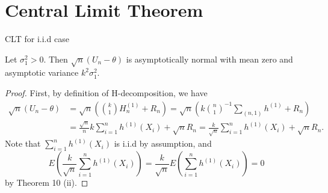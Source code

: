 \documentclass{beamer}
\theoremstyle{definition}
\numberwithin{Def}{section}
\begin{document}
\section{Central Limit Theorem}
\begin{frame}{CLT for i.i.d case}
\begin{fontsize}{7}{12}  
\begin{theorem}
    Let $\sigma_1^{2} > 0$. Then $\sqrt{n}(U_n - \theta)$ is asymptotically normal with mean zero and asymptotic variance $k^2 \sigma_1^2$.
    \end{theorem}
    
    \begin{proof}
      First, by definition of H-decomposition, we have 
      \begin{align*}
          \sqrt{n}(U_n - \theta) &= \sqrt{n} \left( {k \choose 1} H_n^{(1)} + R_n \right) 
          = \sqrt{n} \left( k {n \choose 1}^{-1} \sum_{ (n,1) } h^{(1)} + R_n \right) \\
          &= \frac{\sqrt{n}}{n} k \sum_{i = 1}^{n} h^{(1)}(X_i) + \sqrt{n}R_n 
          = \frac{k}{\sqrt{n}} \sum_{i = 1}^{n} h^{(1)}(X_i) + \sqrt{n}R_n.
          \end{align*}
      Note that $\sum_{i = 1}^{n} h^{(1)}(X_i)$ is i.i.d by assumption, and $$ E (\frac{k}{\sqrt{n}} \sum_{i = 1}^{n} h^{(1)}(X_i)) = \frac{k}{\sqrt{n}} E( \sum_{i = 1}^{n}h^{(1)} (X_i) ) = 0$$
      by Theorem 10 (ii). 
      \end{proof}
      \end{fontsize}
      \end{frame}
      
\end{document}
